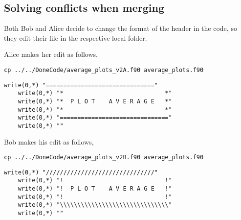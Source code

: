 \documentclass[a4paper,10pt]{article}
\begin{document}
\subsection{Solving conflicts when merging}
Both Bob and Alice decide to change the format of the header in the code, so they edit their file in the respective local folder. 
% 

Alice makes her edit as follows,

\begin{lstlisting}[style=AliceFake]
 cp ../../DoneCode/average_plots_v2A.f90 average_plots.f90
\end{lstlisting}
\begin{lstlisting}[style=Text]
    write(0,*) "==============================="
    write(0,*) "*                             *"
    write(0,*) "*  P L O T    A V E R A G E   *"
    write(0,*) "*                             *"
    write(0,*) "==============================="
    write(0,*) ""
\end{lstlisting}

Bob makes his edit as follows,
\begin{lstlisting}[style=BobFake]
 cp ../../DoneCode/average_plots_v2B.f90 average_plots.f90
\end{lstlisting}
\begin{lstlisting}[style=Text]
    write(0,*) "///////////////////////////////"
    write(0,*) "!                             !"
    write(0,*) "!  P L O T    A V E R A G E   !"
    write(0,*) "!                             !"
    write(0,*) "\\\\\\\\\\\\\\\\\\\\\\\\\\\\\\\"
    write(0,*) ""
\end{lstlisting}
\end{document}
